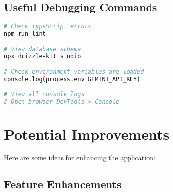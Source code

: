 \documentclass[11pt,a4paper]{article}
\begin{document}
\subsection{Useful Debugging Commands}

\begin{lstlisting}[language=bash]
# Check TypeScript errors
npm run lint

# View database schema
npx drizzle-kit studio

# Check environment variables are loaded
console.log(process.env.GEMINI_API_KEY)

# View all console logs
# Open browser DevTools > Console
\end{lstlisting}


\section{Potential Improvements}

Here are some ideas for enhancing the application:

\subsection{Feature Enhancements}
\end{document}
